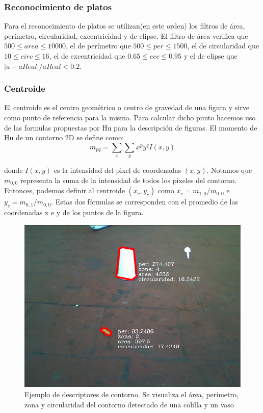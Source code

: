 	\subsubsection{Reconocimiento de platos}
	Para el reconocimiento de platos se utilizan(en este orden) los filtros de \'area, per\'imetro, circularidad, excentricidad y de elipse.
	El filtro de \'area verifica que $500 \leq area \leq 10000 $, el de per\'imetro que $500 \leq per \leq 1500 $, el de circularidad
	que $10 \leq circ \leq 16$, el de excentricidad que $0.65 \leq ecc \leq 0.95$ y el de elipse que $|a-aReal|/ aReal < 0.2$.
	
	\subsubsection{Centroide}
	El centroide es el centro geom\'etrico o centro de 
	gravedad de una figura y 
	sirve como punto de referencia para la misma. Para calcular dicho 
	punto hacemos uso de las formulas propuestas por Hu \cite{Hu1962} para la 
	descripci\'on de figuras. El momento de Hu de un contorno 2D se define como:
	\begin{equation}
		m_{pq}=\sum_{x}{\sum_{y}{x^py^qI(x,y)}}
	\end{equation}
	
	donde $I(x,y)$ es la intensidad del pixel de coordenadas $(x,y)$.
	Notamos que $m_{0,0}$ representa la suma de la intensidad de todos los pixeles del 
	contorno. Entonces, podemos definir al centroide $(x_c,y_c)$ como 
	$x_c= m_{1,0} / m_{0,0}$ e 
	$y_c=m_{0,1} / m_{0,0}$. Estas dos f\'ormulas se corresponden con el 
	promedio de las coordenadas x e y de los puntos de la figura.  


\begin{figure}[tpb]
\begin{center}
  \includegraphics[scale=0.4]{vision/figures/filtros.png}
\end{center}
  \caption[Ejemplo de descriptores de contorno]{\small Ejemplo de descriptores de contorno. Se visualiza el \'area, per\'imetro, zona y circularidad del contorno 
  detectado de una colilla y un vaso}
  \label{fig:desc}
\end{figure}

